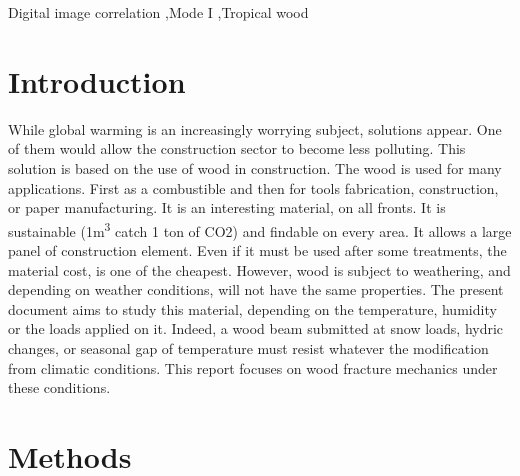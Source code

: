 \documentclass[3p,times,procedia]{elsarticle}
\begin{document}
\begin{frontmatter}
\begin{keyword}
Digital image correlation \sep Mode I \sep Tropical wood
\end{keyword}
\end{frontmatter}



\begin{nomenclature}
\begin{deflist}[A]
\end{deflist}
\end{nomenclature}

\section{Introduction}\label{S:intro}

While global warming is an increasingly worrying subject, solutions appear. One of them would allow the construction sector to become less polluting. This solution is based on the use of wood in construction. The wood is used for many applications. First as a combustible and then for tools fabrication, construction, or paper manufacturing. It is an interesting material, on all fronts. It is sustainable (1\si{\cubic\meter} catch 1 ton of CO2) and findable on every area. It allows a large panel of construction element. Even if it must be used after some treatments, the material cost, is one of the cheapest. However, wood is subject to weathering, and depending on weather conditions, will not have the same properties. The present document aims to study this material, depending on the temperature, humidity or the loads applied on it. Indeed, a wood beam submitted at snow loads, hydric changes, or seasonal gap of temperature must resist whatever the modification from climatic conditions. This report focuses on wood fracture mechanics under these conditions.


\cite{Dong201975}
\section{Methods}\label{S:method}
\end{document}
